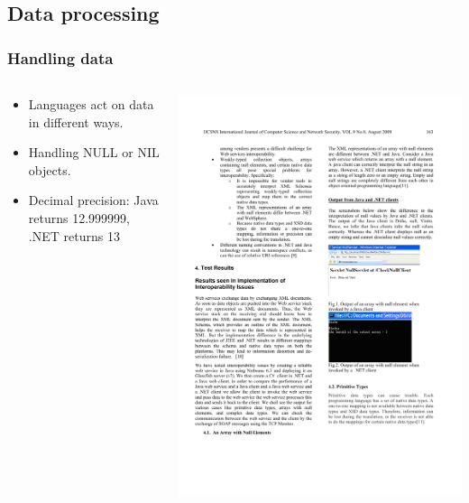 \documentclass{beamer}
\begin{document}
\subsection{Data processing}
\begin{frame}
  \frametitle{Handling data}
  
  \begin{columns}
  \begin{column}{0.5\textwidth}
  \begin{itemize}
  \item Languages act on data in different ways. %
  \item Handling NULL or NIL objects.
  \item Decimal precision: Java returns 12.999999, .NET returns 13
  \end{itemize}
  \end{column}
  
  \begin{column}{0.5\textwidth}
  \includegraphics[scale=0.8]{graphics/JavaNull.pdf}
  

\end{column}
\end{columns}
\end{frame}
\end{document}
